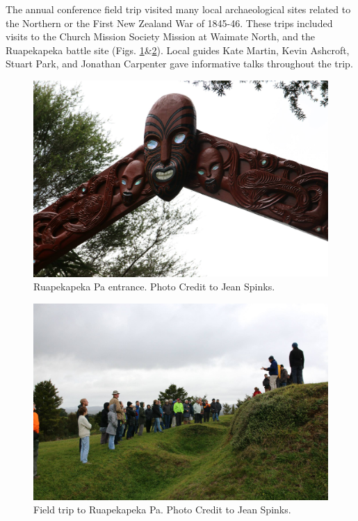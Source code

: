 The annual conference field trip visited many local archaeological sites related to the Northern or the First New Zealand War of 1845-46. These trips included visits to the Church Mission Society Mission at Waimate North, and the Ruapekapeka battle site (Figs. \ref{fig:NZAA_Fig3}\&\ref{fig:NZAA_Fig4}). Local guides Kate Martin, Kevin Ashcroft, Stuart Park, and Jonathan Carpenter gave informative talks throughout the trip.

	\begin{figure}
		\includegraphics[width=\linewidth]{figures/NZAA_Fig3.jpg}
		\centering
		\caption{Ruapekapeka Pa entrance. Photo Credit to Jean Spinks.}
		\label{fig:NZAA_Fig3}
	\end{figure}
	\begin{figure}
		\includegraphics[width=\linewidth]{figures/NZAA_Fig4.jpg}
		\centering
		\caption{Field trip to Ruapekapeka Pa. Photo Credit to Jean Spinks.}
		\label{fig:NZAA_Fig4}
	\end{figure}
	
